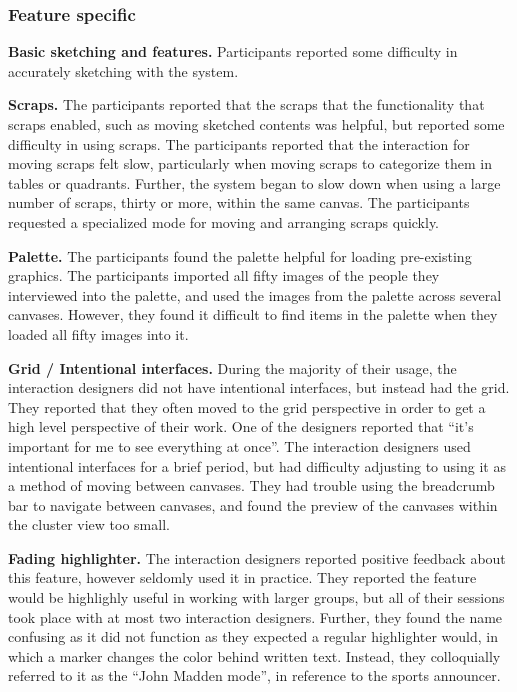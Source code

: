 \subsubsection{Feature specific}

\textbf{Basic sketching and features.} Participants reported some difficulty in accurately sketching with the system.

\textbf{Scraps.} The participants reported that the scraps that the functionality that scraps enabled, such as moving sketched contents was helpful, but reported some difficulty in using scraps. The participants reported that the interaction for moving scraps felt slow, particularly when moving scraps to categorize them in tables or quadrants. Further, the system began to slow down when using a large number of scraps, thirty or more, within the same canvas. The participants requested a specialized mode for moving and arranging scraps quickly.

\textbf{Palette.} The participants found the palette helpful for loading pre-existing graphics. The participants imported all fifty images of the people they interviewed into the palette, and used the images from the palette across several canvases. However, they found it difficult to find items in the palette when they loaded all fifty images into it.

\textbf{Grid / Intentional interfaces.} During the majority of their usage, the interaction designers did not have intentional interfaces, but instead had the grid. They reported that they often moved to the grid perspective in order to get a high level perspective of their work. One of the designers reported that ``it's important for me to see everything at once''. The interaction designers used intentional interfaces for a brief period, but had difficulty adjusting to using it as a method of moving between canvases. They had trouble using the breadcrumb bar to navigate between canvases, and found the preview of the canvases within the cluster view too small.

\textbf{Fading highlighter.} The interaction designers reported positive feedback about this feature, however seldomly used it in practice. They reported the feature would be highlighly useful in working with larger groups, but all of their sessions took place with at most two interaction designers. Further, they found the name confusing as it did not function as they expected a regular highlighter would, in which a marker changes the color behind written text. Instead, they colloquially referred to it as the ``John Madden mode'', in reference to the sports announcer.

